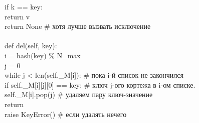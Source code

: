 \documentclass[a4paper, fleqn]{article}
\begin{document}
{\begin{tabbing}
		\> \> \> if k == key:\\
		\> \> \> \> return v\\
		\> \> \> return None \hspace{1cm} \# хотя лучше вызвать исключение\\
		\\
		\> def del(self, key):\\
		\> \> i = hash(key) \% N\_max \\
		\> \> j = 0\\
		\> \> while j < len(self.\_M[i]): \hspace{1cm} \# пока i-й список не закончился\\ 
		\> \> \> if self.\_M[i][j][0] == key: \hspace{1cm} \# ключ j-ого кортежа в i-ом списке.\\
		\> \> \> \> self.\_M[i].pop(j) \hspace{1cm} \# удаляем пару ключ-значение\\
		\> \> \> \> return\\
		\> \> raise KeyError() \hspace{1cm} \# если удалять нечего		
	\end{tabbing}
}
\end{document}
